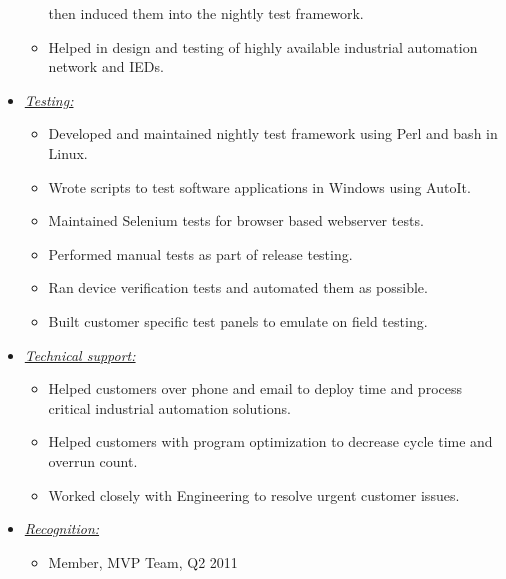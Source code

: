 \documentclass{article}
\begin{document}
\begin{itemize}
\begin{itemize}
                then induced them into the nightly test framework.
          \item Helped in design and testing of highly available industrial
                automation network and IEDs.
          \end{itemize}
    \item \underline{\it Testing:}
          \begin{itemize}
          \item Developed and maintained nightly test framework using Perl
                and bash in Linux.
          \item Wrote scripts to test software applications in Windows using
                AutoIt.
          \item Maintained Selenium tests for browser based webserver tests.
          \item Performed manual tests as part of release testing.
          \item Ran device verification tests and automated them as possible.
          \item Built customer specific test panels to emulate on field testing.
          \end{itemize}
    \item \underline{\it Technical support:}
          \begin{itemize}
          \item Helped customers over phone and email to deploy time and process
                critical industrial automation solutions.
          \item Helped customers with program optimization to decrease cycle
                time and overrun count.
          \item Worked closely with Engineering to resolve urgent customer
                issues.
          \end{itemize}
    \item \underline{\it Recognition:}
          \begin{itemize}
          \item Member, MVP Team, Q2 2011
          \end{itemize}
    \end{itemize}
    \bigskip
\end{document}

